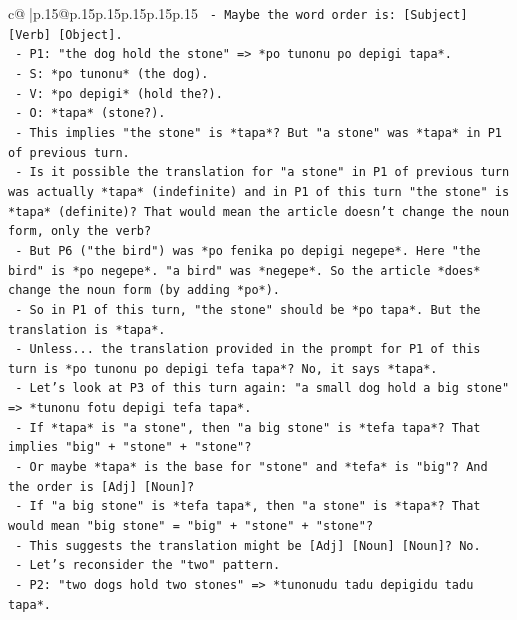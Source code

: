 \documentclass{article}
\begin{document}
{\begin{supertabular}{c@{$\;$}|p{.15\linewidth}@{}p{.15\linewidth}p{.15\linewidth}p{.15\linewidth}p{.15\linewidth}p{.15\linewidth}}
{{{\texttt{        {-} Maybe the word order is: {[}Subject{]} {[}Verb{]} {[}Object{]}.} \\
\texttt{        {-} P1: "the dog hold the stone" => *po tunonu po depigi tapa*.} \\
\texttt{          {-} S: *po tunonu* (the dog).} \\
\texttt{          {-} V: *po depigi* (hold the?).} \\
\texttt{          {-} O: *tapa* (stone?).} \\
\texttt{          {-} This implies "the stone" is *tapa*? But "a stone" was *tapa* in P1 of previous turn.} \\
\texttt{          {-} Is it possible the translation for "a stone" in P1 of previous turn was actually *tapa* (indefinite) and in P1 of this turn "the stone" is *tapa* (definite)? That would mean the article doesn't change the noun form, only the verb?} \\
\texttt{          {-} But P6 ("the bird") was *po fenika po depigi negepe*. Here "the bird" is *po negepe*. "a bird" was *negepe*. So the article *does* change the noun form (by adding *po*).} \\
\texttt{          {-} So in P1 of this turn, "the stone" should be *po tapa*. But the translation is *tapa*.} \\
\texttt{          {-} Unless... the translation provided in the prompt for P1 of this turn is *po tunonu po depigi tefa tapa*? No, it says *tapa*.} \\
\texttt{          {-} Let's look at P3 of this turn again: "a small dog hold a big stone" => *tunonu fotu depigi tefa tapa*.} \\
\texttt{            {-} If *tapa* is "a stone", then "a big stone" is *tefa tapa*? That implies "big" + "stone" + "stone"?} \\
\texttt{            {-} Or maybe *tapa* is the base for "stone" and *tefa* is "big"? And the order is {[}Adj{]} {[}Noun{]}?} \\
\texttt{            {-} If "a big stone" is *tefa tapa*, then "a stone" is *tapa*? That would mean "big stone" = "big" + "stone" + "stone"?} \\
\texttt{            {-} This suggests the translation might be {[}Adj{]} {[}Noun{]} {[}Noun{]}? No.} \\
\texttt{            {-} Let's reconsider the "two" pattern.} \\
\texttt{            {-} P2: "two dogs hold two stones" => *tunonudu tadu depigidu tadu tapa*.} \\
}}}
\end{supertabular}}
\end{document}
